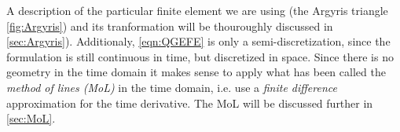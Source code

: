 A description of the particular finite element we are using (the Argyris triangle
\autoref{fig:Argyris}) and its tranformation will be thouroughly discussed in
\autoref{sec:Argyris}). Additionaly, \eqref{eqn:QGEFE} is only a semi-discretization, since the
formulation is still continuous in time, but discretized in space. Since there is no geometry in the
time domain it makes sense to apply what has been called the \emph{method of lines (MoL)} in the time
domain, i.e. use a \emph{finite difference} approximation for the time derivative. The MoL will be
discussed further in \autoref{sec:MoL}.


